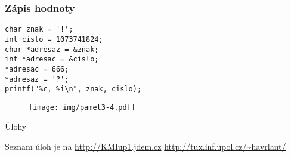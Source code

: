 \documentclass{beamer}
\begin{document}
\begin{frame}[t,fragile]\frametitle{Zápis hodnoty} 
\begin{verbatim} 
char znak = '!';
int cislo = 1073741824;
char *adresaz = &znak;
int *adresac = &cislo;
*adresac = 666;
*adresaz = '?';
printf("%c, %i\n", znak, cislo);
\end{verbatim}

\begin{figure}[htb]
    \centering
    \texttt{[image: img/pamet3-4.pdf]}
\end{figure}
\end{frame}


\begin{frame}[t,fragile]{Úlohy}
\begin{center}
\vskip 1cm
{\Large Seznam úloh je na \url{http://KMIup1.jdem.cz}}
\vskip 2cm
\url{http://tux.inf.upol.cz/~havrlant/}
\end{center}
\end{frame}
\end{document}
